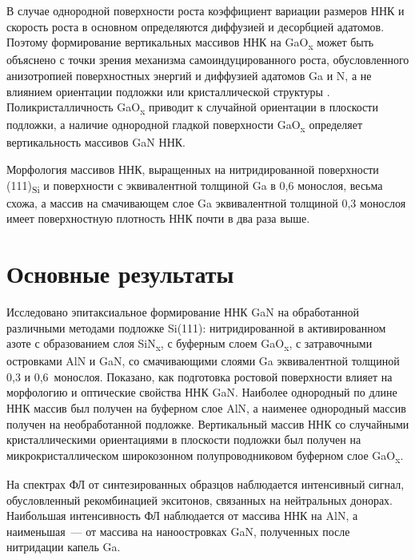 В случае однородной поверхности роста коэффициент вариации размеров ННК и
скорость роста в основном определяются диффузией и десорбцией адатомов. Поэтому
формирование вертикальных массивов ННК на GaO\textsubscript{x} может быть
объяснено с точки зрения механизма самоиндуцированного роста, обусловленного
анизотропией поверхностных энергий и диффузией адатомов Ga и N, а не влиянием
ориентации подложки или кристаллической структуры \cite{Sobanska2016}.
Поликристалличность GaO\textsubscript{x} приводит к случайной ориентации в
плоскости подложки, а наличие однородной гладкой поверхности
GaO\textsubscript{x} определяет вертикальность массивов GaN ННК.

Морфология массивов ННК, выращенных на нитридированной поверхности
(111)\textsubscript{Si} и поверхности с эквивалентной толщиной Ga в 0,6
монослоя, весьма схожа, а массив на смачивающем слое Ga эквивалентной толщиной
0,3 монослоя имеет поверхностную плотность ННК почти в два раза выше.

\section{Основные результаты}\label{sec:ch4/sec6}

Исследовано эпитаксиальное формирование ННК GaN на обработанной различными
методами подложке Si(111): нитридированной в активированном азоте с
образованием слоя SiN\textsubscript{x}, с буферным слоем GaO\textsubscript{x},
с затравочными островками AlN и GaN, со смачивающими слоями Ga эквивалентной
толщиной 0,3 и 0,6~монослоя. Показано, как подготовка ростовой поверхности
влияет на морфологию и оптические свойства ННК GaN. Наиболее однородный по
длине ННК массив был получен на буферном слое AlN, а наименее однородный массив
получен на необработанной подложке. Вертикальный массив ННК со случайными
кристаллическими ориентациями в плоскости подложки был получен на
микрокристаллическом широкозонном полупроводниковом буферном слое
GaO\textsubscript{x}.

На спектрах ФЛ от синтезированных образцов наблюдается интенсивный сигнал,
обусловленный рекомбинацией экситонов, связанных на нейтральных донорах.
Наибольшая интенсивность ФЛ наблюдается от массива ННК на AlN, а наименьшая~---
от массива на наноостровках GaN, полученных после нитридации капель Ga.

\FloatBarrier
